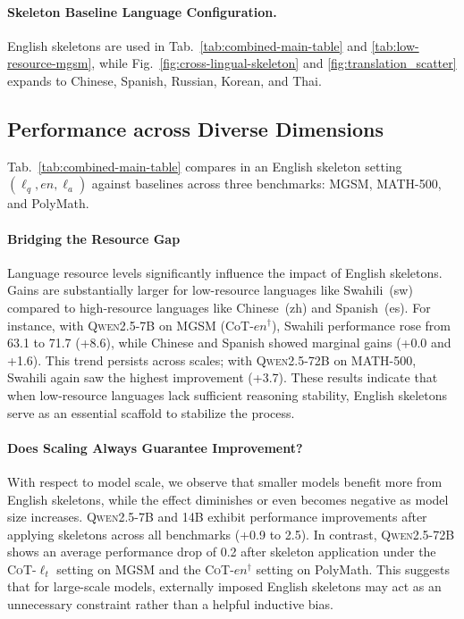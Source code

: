 \paragraph{Skeleton Baseline Language Configuration.} 
English skeletons are used in Tab.~\ref{tab:combined-main-table} and \ref{tab:low-resource-mgsm}, while Fig.~\ref{fig:cross-lingual-skeleton} and \ref{fig:translation_scatter} expands to Chinese, Spanish, Russian, Korean, and Thai.

\subsection{Performance across Diverse Dimensions}
Tab.~\ref{tab:combined-main-table} compares \LASEF in an English skeleton setting $(\ell_q, en, \ell_a)$ against baselines across three benchmarks: MGSM, MATH-500, and PolyMath.

\paragraph{Bridging the Resource Gap}
Language resource levels significantly influence the impact of English skeletons. Gains are substantially larger for low-resource languages like Swahili~(sw) compared to high-resource languages like Chinese~(zh) and Spanish~(es). For instance, with \textsc{Qwen2.5-7B} on MGSM (CoT-$en^{\dagger}$), Swahili performance rose from 63.1 to 71.7 (+8.6), while Chinese and Spanish showed marginal gains (+0.0 and +1.6). This trend persists across scales; with \textsc{Qwen2.5-72B} on MATH-500, Swahili again saw the highest improvement (+3.7). These results indicate that when low-resource languages lack sufficient reasoning stability, English skeletons serve as an essential scaffold to stabilize the process.


\paragraph{Does Scaling Always Guarantee Improvement?}
With respect to model scale, we observe that smaller models benefit more from English skeletons, while the effect diminishes or even becomes negative as model size increases. \textsc{Qwen2.5-7B} and \textsc{14B} exhibit performance improvements after applying skeletons across all benchmarks (+0.9 to 2.5). In contrast, \textsc{Qwen2.5-72B} shows an average performance drop of 0.2 after skeleton application under the \textsc{CoT}-$\ell_t$ setting on MGSM and the \textsc{CoT}-$en^{\dagger}$ setting on PolyMath. This suggests that for large-scale models, externally imposed English skeletons may act as an unnecessary constraint rather than a helpful inductive bias.

